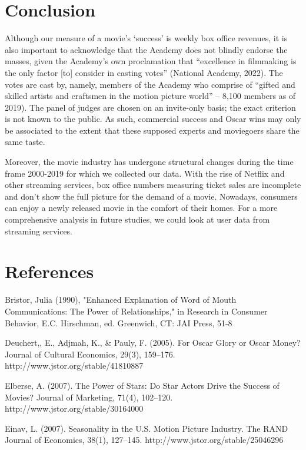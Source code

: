 \documentclass[11pt]{article} %
\begin{document}
\section{Conclusion}


Although our measure of a movie’s ‘success’ is weekly box office revenues, it is also important to acknowledge that the Academy does not blindly endorse the masses, given the Academy’s own proclamation that “excellence in filmmaking is the only factor [to] consider in casting votes” (National Academy, 2022). The votes are cast by, namely, members of the Academy who comprise of “gifted and skilled artists and craftsmen in the motion picture world” -- 8,100 members as of 2019). The panel of judges are chosen on an invite-only basis; the exact criterion is not known to the public. As such, commercial success and Oscar wins may only be associated to the extent that these supposed experts and moviegoers share the same taste. 

Moreover, the movie industry has undergone structural changes during the time frame 2000-2019 for which we collected our data. With the rise of Netflix and other streaming services, box office numbers measuring ticket sales are incomplete and don't show the full picture for the demand of a movie. Nowadays, consumers can enjoy a newly released movie in the comfort of their homes. For a more comprehensive analysis in future studies, we could look at user data from streaming services. 






\newpage
\section*{References}
\leftskip 0.3in
\parindent -0.3in

\noindent 
 
  Bristor, Julia (1990), "Enhanced Explanation of Word of Mouth Communications: The Power of Relationships," in Research in Consumer Behavior, E.C. Hirschman, ed. Greenwich, CT: JAI Press, 51-8

Deuchert,, E., Adjmah, K., & Pauly, F. (2005). For Oscar Glory or Oscar Money? Journal of Cultural Economics, 29(3), 159–176. http://www.jstor.org/stable/41810887 

Elberse, A. (2007). The Power of Stars: Do Star Actors Drive the Success of Movies? Journal of Marketing, 71(4), 102–120. http://www.jstor.org/stable/30164000 

Einav, L. (2007). Seasonality in the U.S. Motion Picture Industry. The RAND Journal of Economics, 38(1), 127–145. http://www.jstor.org/stable/25046296 
 
\end{document}
